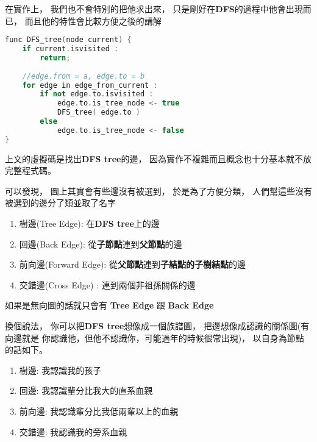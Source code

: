 \documentclass[12pt,oneside]{article}
\begin{document}
在實作上，
我們也不會特別的把他求出來，
只是剛好在\textbf{DFS}的過程中他會出現而已，
而且他的特性會比較方便之後的講解
\vspace*{3em}
\begin{lstlisting}[language=C++,escapeinside=``]
func DFS_tree(node current) {
    if current.isvisited : 
        return;
    
    //edge.from = a, edge.to = b
    for edge in edge_from_current :
        if not edge.to.isvisited :
            edge.to.is_tree_node <- true
            DFS_tree( edge.to )
        else   
            edge.to.is_tree_node <- false
}
\end{lstlisting}
\vspace*{3em}

上文的虛擬碼是找出\textbf{DFS tree}的邊，
因為實作不複雜而且概念也十分基本就不放完整程式碼。

可以發現，
圖上其實會有些邊沒有被選到，
於是為了方便分類，
人們幫這些沒有被選到的邊分了類並取了名字

\begin{enumerate}
    \item 
        樹邊(Tree Edge): 在\textbf{DFS tree}上的邊
    \item 
        回邊(Back Edge): 從\textbf{子節點}連到\textbf{父節點}的邊
    \item 
        前向邊(Forward Edge): 從\textbf{父節點}連到\textbf{子結點的子樹結點}的邊
    \item 
        {\color{blue}交錯邊}(Cross Edge) : 連到兩個非祖孫關係的邊
\end{enumerate}

如果是無向圖的話就只會有 \textbf{Tree Edge} 跟 \textbf{ Back Edge }

\vspace{1em}
換個說法，
你可以把\textbf{DFS tree}想像成一個族譜圖，
把邊想像成認識的關係圖(有向邊就是 你認識他，但他不認識你，可能過年的時候很常出現)，
以自身為節點的話如下。

\begin{enumerate}
    \item 樹邊: 我認識我的孩子
    \item 回邊: 我認識輩分比我大的直系血親
    \item 前向邊: 我認識輩分比我低兩輩以上的血親 
    \item 交錯邊: 我認識我的旁系血親
\end{enumerate}
\end{document}
